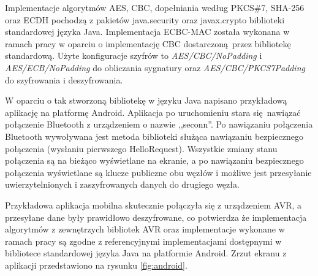 Implementacje algorytmów AES, CBC, dopełniania według PKCS\#7, SHA-256 oraz ECDH pochodzą z pakietów java.security oraz javax.crypto biblioteki standardowej języka Java. Implementacja ECBC-MAC została wykonana w ramach pracy w oparciu o implementację CBC dostarczoną przez bibliotekę standardową. Użyte konfiguracje szyfrów to \emph{AES/CBC/NoPadding} i \emph{AES/ECB/NoPadding} do obliczania sygnatury oraz \emph{AES/CBC/PKCS7Padding} do szyfrowania i deszyfrowania.

W oparciu o tak stworzoną bibliotekę w języku Java napisano przykładową aplikację na platformę Android. Aplikacja po uruchomieniu stara się nawiązać połączenie Bluetooth z urządzeniem o nazwie ,,seconn''. Po nawiązaniu połączenia Bluetooth wywoływana jest metoda biblioteki służąca nawiązaniu bezpiecznego połączenia (wysłaniu pierwszego HelloRequest). Wszystkie zmiany stanu połączenia są na bieżąco wyświetlane na ekranie, a po nawiązaniu bezpiecznego połączenia wyświetlane są klucze publiczne obu węzłów i możliwe jest przesyłanie uwierzytelnionych i zaszyfrowanych danych do drugiego węzła.

Przykładowa aplikacja mobilna skutecznie połączyła się z urządzeniem AVR, a przesyłane dane były prawidłowo deszyfrowane, co potwierdza że implementacja algorytmów z zewnętrzych bibliotek AVR oraz implementacje wykonane w ramach pracy są zgodne z referencyjnymi implementacjami dostępnymi w bibliotece standardowej języka Java na platformie Android. Zrzut ekranu z aplikacji przedstawiono na rysunku \ref{fig:android}.

